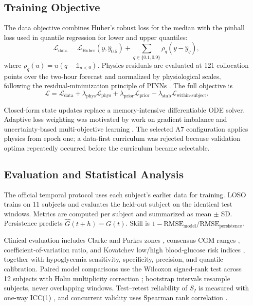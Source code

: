 \documentclass[journal]{IEEEtran}
\begin{document}
\subsection{Training Objective}

The data objective combines Huber's robust loss \cite{ref39} for the median with the pinball loss used in quantile regression \cite{ref40} for lower and upper quantiles:
\begin{equation}
\mathcal{L}_{\text{data}} = \mathcal{L}_{\text{Huber}}(y, \hat{y}_{0.5}) + \sum_{q \in \{0.1, 0.9\}} \rho_q(y - \hat{y}_q),
\label{eq:16}
\end{equation}
where $\rho_q(u) = u(q - \mathbb{1}_{u<0})$. Physics residuals are evaluated at 121 collocation points over the two-hour forecast and normalized by physiological scales, following the residual-minimization principle of PINNs \cite{ref8}. The full objective is
\begin{equation}
\mathcal{L} = \mathcal{L}_{\text{data}} + \lambda_{\text{phys}} \mathcal{L}_{\text{phys}} + \lambda_{\text{prior}} \mathcal{L}_{\text{prior}} + \lambda_{\text{stab}} \mathcal{L}_{\text{within-subject}}.
\label{eq:17}
\end{equation}

Closed-form state updates replace a memory-intensive differentiable ODE solver. Adaptive loss weighting was motivated by work on gradient imbalance and uncertainty-based multi-objective learning \cite{ref41,ref42}. The selected A7 configuration applies physics from epoch one; a data-first curriculum was rejected because validation optima repeatedly occurred before the curriculum became selectable.

\subsection{Evaluation and Statistical Analysis}

The official temporal protocol uses each subject's earlier data for training. LOSO trains on 11 subjects and evaluates the held-out subject on the identical test windows. Metrics are computed per subject and summarized as mean $\pm$ SD. Persistence predicts $\hat{G}(t+h) = G(t)$. Skill is $1 - \text{RMSE}_{\text{model}}/\text{RMSE}_{\text{persistence}}$.

Clinical evaluation includes Clarke and Parkes zones \cite{ref43,ref44,ref45}, consensus CGM ranges \cite{ref52}, coefficient-of-variation ratio, and Kovatchev low/high blood-glucose risk indices \cite{ref46,ref47}, together with hypoglycemia sensitivity, specificity, precision, and quantile calibration. Paired model comparisons use the Wilcoxon signed-rank test \cite{ref48} across 12 subjects with Holm multiplicity correction \cite{ref49}; bootstrap intervals resample subjects, never overlapping windows. Test--retest reliability of $S_I$ is measured with one-way ICC(1) \cite{ref50}, and concurrent validity uses Spearman rank correlation \cite{ref51}.
\end{document}
